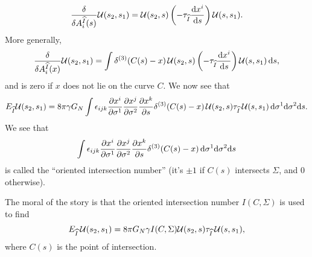 \begin{equation}
\frac{\delta}{\delta A^{\widehat{I}}_{i}(s)}\mathcal{U}(s_{2},s_{1})
= \mathcal{U}(s_{2},s)\left(-\tau_{\widehat{I}}\frac{\mathrm{d} x^{i}}{\mathrm{d} s}\right)\mathcal{U}(s,s_{1}).
\end{equation}
More generally,
\begin{equation}
\frac{\delta}{\delta A^{\widehat{I}}_{i}(x)}\mathcal{U}(s_{2},s_{1})
= \int\delta^{(3)}(C(s)-x)\,\mathcal{U}(s_{2},s)\left(-\tau_{\widehat{I}}\frac{\mathrm{d} x^{i}}{\mathrm{d} s}\right)\mathcal{U}(s,s_{1})\,\mathrm{d} s,
\end{equation}
and is zero if $x$ does not lie on the curve $C$.
We now see that
\begin{equation}
E_{\widehat{I}}\mathcal{U}(s_{2},s_{1}) = 8\pi\gamma
G_{N}\int\epsilon_{ijk}\frac{\partial
    x^{i}}{\partial\sigma^{1}}\frac{\partial
    x^{j}}{\partial\sigma^{2}}\frac{\partial x^{k}}{\partial s}\delta^{(3)}(C(s)-x)\,\mathcal{U}(s_{2},s)\tau_{\widehat{I}}\,\mathcal{U}(s,s_{1})\,\mathrm{d}\sigma^{1}\mathrm{d}\sigma^{2}\mathrm{d} s.
\end{equation}
We see that
\begin{equation*}
\int\epsilon_{ijk}\frac{\partial
    x^{i}}{\partial\sigma^{1}}\frac{\partial
    x^{j}}{\partial\sigma^{2}}\frac{\partial x^{k}}{\partial s}\delta^{(3)}(C(s)-x)\,\mathrm{d}\sigma^{1}\mathrm{d}\sigma^{2}\mathrm{d} s
\end{equation*}
is called the ``oriented intersection number'' (it's $\pm1$ if $C(s)$
intersects $\Sigma$, and $0$ otherwise).

The moral of the story is that the oriented intersection number
$I(C,\Sigma)$ is used to find
\begin{equation}
E_{\widehat{I}}\,\mathcal{U}(s_{2},s_{1}) =
8\pi G_{N}\gamma I(C,\Sigma)\mathcal{U}(s_{2},s)\tau_{\widehat{I}}\,\mathcal{U}(s,s_{1}),
\end{equation}
where $C(s)$ is the point of intersection.

